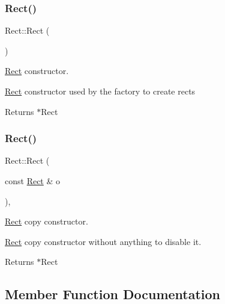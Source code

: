 \subsubsection{\texorpdfstring{Rect()}{Rect()}\hspace{0.1cm}{\footnotesize\ttfamily [1/2]}}
{\footnotesize\ttfamily Rect\+::\+Rect (\begin{DoxyParamCaption}{ }\end{DoxyParamCaption})\hspace{0.3cm}{\ttfamily [protected]}}



\hyperlink{class_rect}{Rect} constructor. 

\hyperlink{class_rect}{Rect} constructor used by the factory to create rects

\begin{DoxyReturn}{Returns}
$\ast$\+Rect 
\end{DoxyReturn}
\mbox{\label{class_rect_af7bc3c8e555de1401faff38c7e348a24}} 
\subsubsection{\texorpdfstring{Rect()}{Rect()}\hspace{0.1cm}{\footnotesize\ttfamily [2/2]}}
{\footnotesize\ttfamily Rect\+::\+Rect (\begin{DoxyParamCaption}\item[{const \hyperlink{class_rect}{Rect} \&}]{o }\end{DoxyParamCaption})\hspace{0.3cm}{\ttfamily [inline]}, {\ttfamily [protected]}}



\hyperlink{class_rect}{Rect} copy constructor. 

\hyperlink{class_rect}{Rect} copy constructor without anything to disable it.

\begin{DoxyReturn}{Returns}
$\ast$\+Rect 
\end{DoxyReturn}


\subsection{Member Function Documentation}
\mbox{\label{class_rect_ac9283327c926d453d0cd5a49ded8d150}} 
